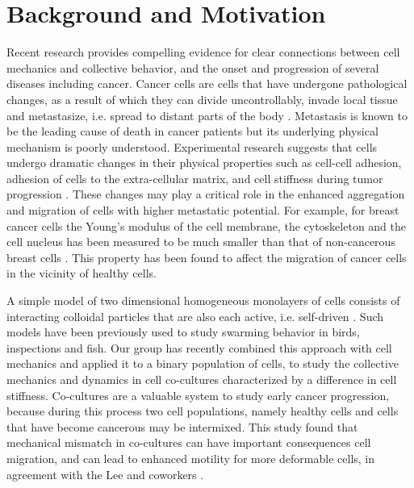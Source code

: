\documentclass[aps,prb,twocolumn,groupedaddress,nofootinbib,floatfix]{revtex4}
\begin{document}
\maketitle

\section*{Background and Motivation}

Recent research provides compelling evidence for clear connections between cell mechanics and collective behavior, and the onset and progression
of several diseases including cancer. Cancer cells are cells that have undergone pathological changes, as a result of which they can divide uncontrollably, 
invade local tissue and metastasize, i.e. spread to distant parts of the body \cite{Suresh}. Metastasis is known to be the leading cause of death in cancer patients but 
its underlying physical mechanism is poorly understood. Experimental research suggests that cells  undergo dramatic changes in their physical properties such 
as cell-cell adhesion, adhesion of cells to the extra-cellular matrix, and cell stiffness during tumor progression \cite{Suresh}.
These changes may play a critical role in the enhanced aggregation and migration of cells with higher metastatic potential.
For example, for breast cancer cells the Young's modulus of the cell membrane, the cytoskeleton and the cell nucleus has 
been measured to be much smaller than that of non-cancerous breast cells \cite{Lee}.
This property has been found to affect the migration of cancer cells in the vicinity of healthy cells\cite{Lee}. 

A simple model of two dimensional homogeneous monolayers of cells  consists of interacting colloidal particles that are also each active, i.e. self-driven \cite{FilyMarchetti,RednerBaskaran}. 
Such models have been previously used to study swarming  behavior \cite{Vicsek} in birds, inspections and fish.
Our group has recently combined this approach with cell mechanics and applied it to a binary population of cells, to study the collective mechanics and dynamics in cell co-cultures characterized by a difference in cell stiffness.
Co-cultures are a valuable system to study early cancer progression, because during this process two cell populations, namely healthy cells and cells that have become cancerous may be intermixed.   
This study found that mechanical mismatch in co-cultures can have important consequences cell migration, and can lead to enhanced motility for more deformable cells\cite{Butcher}, in agreement with
the Lee and coworkers \cite{Lee}. 
\end{document}
